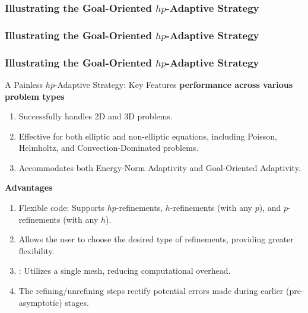 \documentclass[10pt,aspectratio=149]{beamer}
\begin{document}
\begin{frame}[c]
	\frametitle{Illustrating the Goal-Oriented $hp$-Adaptive Strategy}
	\begin{figure}[t!]
	\end{figure}
\end{frame}
\begin{frame}[c]
	\frametitle{Illustrating the Goal-Oriented $hp$-Adaptive Strategy}
\end{frame}
\begin{frame}
	\frametitle{Illustrating the Goal-Oriented $hp$-Adaptive Strategy}
\end{frame}
\begin{frame}{A Painless $hp$-Adaptive Strategy: Key Features}
\textbf{ performance across various problem types}
\setlength{\itemsep}{1mm}
\begin{enumerate}
\item Successfully handles 2D and 3D problems.
\item Effective for both elliptic and non-elliptic equations, including Poisson, Helmholtz, and Convection-Dominated problems.
\item Accommodates both Energy-Norm Adaptivity and Goal-Oriented Adaptivity.
\end{enumerate}

\vspace{5mm}

\textbf{Advantages}
\begin{enumerate}
\item \alert{Flexible} code: Supports $hp$-refinements, $h$-refinements (with any $p$), and $p$-refinements (with any $h$).
\item Allows the user to choose the desired type of refinements, providing greater flexibility.
\item {}: Utilizes a single mesh, reducing computational overhead.
\item The refining/unrefining steps \alert{rectify} potential \alert{errors} made during earlier (pre-asymptotic) stages.
\end{enumerate}
\end{frame}
\end{document}
